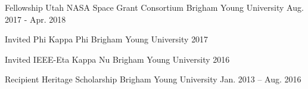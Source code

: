 

\begin{cvhonors}

\cvhonor
	{Fellowship} %
	{Utah NASA Space Grant Consortium} %
	{Brigham Young University} %
	{Aug. 2017 - Apr. 2018} %

  \cvhonor
    {Invited} %
    {Phi Kappa Phi} %
    {Brigham Young University} %
    {2017} %

  \cvhonor
    {Invited} %
    {IEEE-Eta Kappa Nu} %
    {Brigham Young University} %
    {2016} %
    
  \cvhonor
    {Recipient} %
    {Heritage Scholarship} %
    {Brigham Young University} %
    {Jan. 2013 – Aug. 2016} %


\end{cvhonors}
